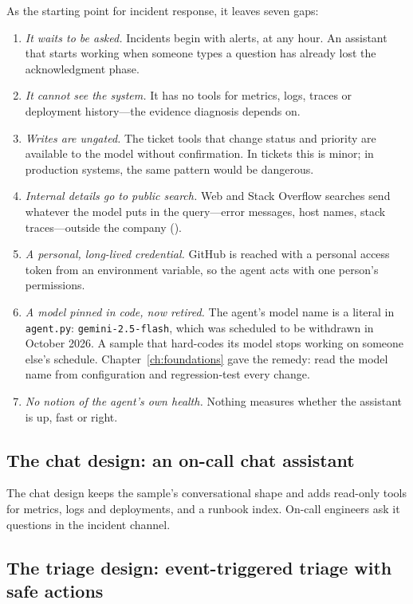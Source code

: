 As the starting point for incident response, it leaves seven gaps:
\begin{enumerate}[itemsep=2pt]
  \item \emph{It waits to be asked.} Incidents begin with alerts, at any hour. An assistant that starts working when someone types a question has already lost the acknowledgment phase.
  \item \emph{It cannot see the system.} It has no tools for metrics, logs, traces or deployment history---the evidence diagnosis depends on.
  \item \emph{Writes are ungated.} The ticket tools that change status and priority are available to the model without confirmation. In tickets this is minor; in production systems, the same pattern would be dangerous.
  \item \emph{Internal details go to public search.} Web and Stack Overflow searches send whatever the model puts in the query---error messages, host names, stack traces---outside the company ().
  \item \emph{A personal, long-lived credential.} GitHub is reached with a personal access token from an environment variable, so the agent acts with one person's permissions.
  \item \emph{A model pinned in code, now retired.} The agent's model name is a literal in \texttt{agent.py}: \texttt{gemini-2.5-flash}, which was scheduled to be withdrawn in October 2026. A sample that hard-codes its model stops working on someone else's schedule. Chapter~\ref{ch:foundations} gave the remedy: read the model name from configuration and regression-test every change.
  \item \emph{No notion of the agent's own health.} Nothing measures whether the assistant is up, fast or right.
\end{enumerate}

\subsection{The chat design: an on-call chat assistant}

The chat design keeps the sample's conversational shape and adds read-only tools for metrics, logs and deployments, and a runbook index. On-call engineers ask it questions in the incident channel.

\subsection{The triage design: event-triggered triage with safe actions}

